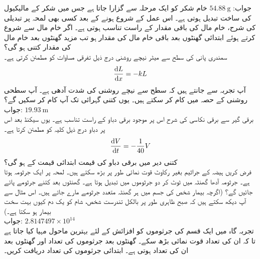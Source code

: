 جواب:\quad
$\SI{54.88}{\gram}$
خام شکر کو  ایک مرحلہ سے گزارا جاتا ہے جس میں شکر کے مالیکیول کی ساخت تبدیل ہوتی ہے۔ اس عمل کے شروع ہونے کے بعد کسی بھی لمحہ پر تبدیلی کی شرح،   خام مال کی باقی مقدار کے راست تناسب ہوتی ہے۔ اگر  خام مال سے شروع کرتے ہوئے ابتدائی  گھنٹوں بعد باقی خام مال کی مقدار   ہو تب مزید  گھنٹوں بعد خام مال کی مقدار کتنی ہو گی؟
\\
سمندری پانی کی سطح سے  میٹر نیچے روشنی  درج ذیل تفرقی مساوات کو مطمئن کرتی ہے۔
\begin{align*}
\frac{\dif L}{\dif x}=-kL
\end{align*}
آپ تجربہ سے جانتے ہیں کہ سطح سے  نیچے روشنی کی شدت آدھی ہے۔ آپ سطحی روشنی کے  حصہ میں کام کر سکتے ہیں۔ یوں کتنی گہرائی تک آپ کام کر سکیں گے؟\\
جواب:\quad
$\SI{19.93}{\meter}$
\\
برقی گیر سے برقی نکاسی کی شرح اس پر موجود برقی دباو کے راست تناسب ہے۔ یوں  سیکنڈ بعد اس پر دباو  درج ذیل کلیہ کو مطمئن کرتا ہے۔
\begin{align*}
\frac{\dif V}{\dif t}=-\frac{1}{40}V
\end{align*}
کتنی دیر میں برقی دباو کی قیمت ابتدائی قیمت کے  ہو گی؟
\\
فرض کریں ہیضہ کے جراثیم بغیر رکاوٹ قوت نمائی طور پر بڑھ سکتے ہیں۔ لمحہ  پر ایک جرثومہ ہوتا ہے۔ جرثومہ  آدھا گھنٹہ میں ٹوٹ کر دو جرثوموں میں تبدیل ہوتا ہے۔  گھنٹوں بعد کتنے جرثومے پائے جائیں گے؟ (اگرچہ بیمار شخص کی جسم میں ہر گھنٹہ متعدد جرثومے مارے جاتے ہیں۔ اس مثال سے آپ دیکھ سکتے ہیں کہ صبح ظاہری طور پر بالکل تندرست شخص، شام کو یک دم کیوں بہت سخت بیمار ہو سکتا ہے۔)\\
جواب:\quad
$2.8147497\times 10^{14}$
\\
تجربہ گاہ میں ایک قسم کی جرثوموں کو افزائش کے لئے بہترین ماحول مہیا کیا جاتا ہے تا کہ ان کی تعداد قوت نمائی بڑھ سکے۔ گھنٹوں بعد جرثوموں کی تعداد  اور  گھنٹوں بعد ان کی تعداد  ہوتی ہے۔ ابتدائی جرثوموں کی تعداد دریافت کریں۔
\\
